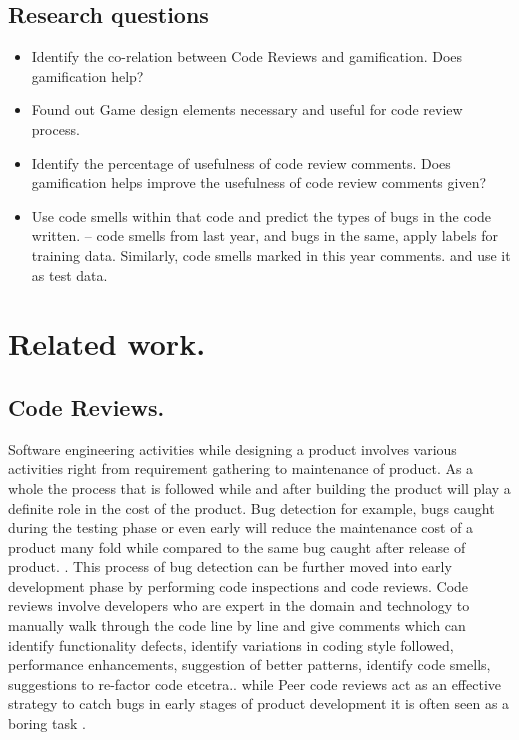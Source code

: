 \documentclass[conference]{IEEEtran}
\begin{document}
\subsection{Research questions}
\begin{itemize}
\item Identify the co-relation between Code Reviews and gamification. Does gamification help?
\item Found out Game design elements necessary and useful for code review process.
\item Identify the percentage of usefulness of code review comments. Does gamification helps improve the usefulness of code review comments given?
\item Use code smells within that code and predict the types of bugs in the code written.
-- code smells from last year, and bugs in the same, apply labels for training data. Similarly, code smells marked in this year comments. and use it as test data.

\end{itemize}

\section{Related work.}

\subsection{Code Reviews.}
Software engineering activities while designing a product involves various activities right from requirement gathering to maintenance of product. As a whole the process that is followed while and after building the product will play a definite role in the cost of the product. Bug detection for example, bugs caught during the testing  phase or even early will reduce the maintenance cost of a product many fold while compared to the same bug caught after release of product. \cite{needed}. This process of bug detection can be further moved into early development phase by performing code inspections and code reviews. Code reviews involve developers who are expert in the domain and technology to manually walk through the code line by line and give comments which can identify functionality defects, identify variations in coding style followed, performance enhancements, suggestion of better patterns, identify code smells, suggestions to re-factor code etcetra.. while Peer code reviews act as an effective strategy to catch bugs in early stages of product development \cite{needed} it is often seen as a boring task \cite{needed}.
\end{document}

